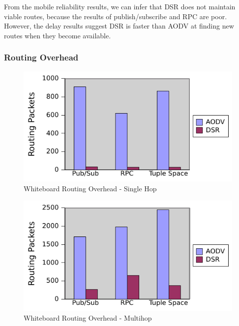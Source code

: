 From the mobile reliability results, we can infer that DSR does not maintain viable routes, because the results of publish/subscribe and RPC are poor. However, the delay results suggest DSR is faster than AODV at finding new routes when they become available.


\subsubsection{Routing Overhead}\label{sec:routing}

\begin{figure}
\centering
\includegraphics[scale = 1]{figures/single-hop-routing.pdf}
\caption{Whiteboard Routing Overhead - Single Hop}
\label{fig:wbrouting-sh}
\end{figure}

\begin{figure}
\centering
\includegraphics[scale = 1]{figures/multi-hop-routing.pdf}
\caption{Whiteboard Routing Overhead - Multihop}
\label{fig:wbrouting-mh}
\end{figure}


